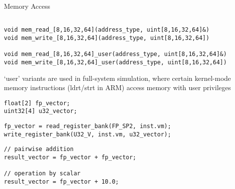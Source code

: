 \begin{frame}[fragile]{Memory Access}

\begin{lstlisting}

void mem_read_[8,16,32,64](address_type, uint[8,16,32,64]&)
void mem_write_[8,16,32,64](address_type, uint[8,16,32,64])

void mem_read_[8,16,32,64]_user(address_type, uint[8,16,32,64]&)
void mem_write_[8,16,32,64]_user(address_type, uint[8,16,32,64])

\end{lstlisting}

`user' variants are used in full-system simulation, where certain 
kernel-mode memory instructions (ldrt/strt in ARM) access memory with
user privileges

\end{frame}

\newsavebox{\vectorboxone}
\begin{lrbox}{\vectorboxone}
\begin{lstlisting}
float[2] fp_vector;
uint32[4] u32_vector;
\end{lstlisting}
\end{lrbox}

\newsavebox{\vectorboxtwo}
\begin{lrbox}{\vectorboxtwo}
\begin{lstlisting}
fp_vector = read_register_bank(FP_SP2, inst.vm);
write_register_bank(U32_V, inst.vm, u32_vector);
\end{lstlisting}
\end{lrbox}

\newsavebox{\vectorboxthree}
\begin{lrbox}{\vectorboxthree}
\begin{lstlisting}
// pairwise addition
result_vector = fp_vector + fp_vector;

// operation by scalar
result_vector = fp_vector + 10.0;
\end{lstlisting}
\end{lrbox}


